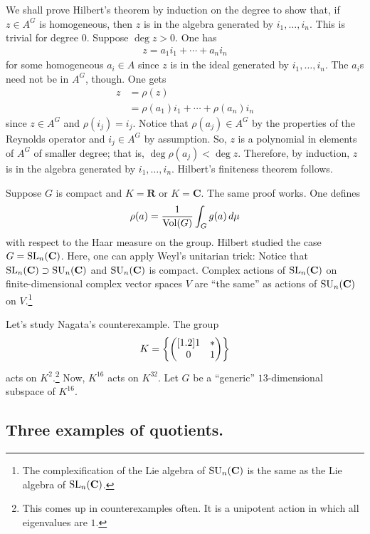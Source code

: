 \documentclass [11 pt, oneside] {article}
\begin{document}
We shall prove Hilbert's theorem by induction on the degree to show that, if $z\in A^G$ is homogeneous, then $z$ is in the algebra generated by $i_1,\hdots,i_n$. This is trivial for degree $0$. Suppose $\deg z > 0$. One has
\begin{align*}
	z=a_1i_1 + \cdots +a_ni_n
\end{align*}
for some homogeneous $a_i\in A$ since $z$ is in the ideal generated by $i_1,\hdots, i_n$. The $a_i$s need not be in $A^G$, though. One gets
\begin{align*}
	z &= \rho(z)\\ 
	  &= \rho(a_1)i_1 + \cdots +\rho(a_n)i_n
\end{align*}
since $z\in A^G$ and $\rho(i_j)=i_j$. Notice that $\rho(a_j) \in A^G$ by the properties of the Reynolds operator and $i_j\in A^G$ by assumption. So, $z$ is a polynomial in elements of $A^G$ of smaller degree; that is, $\deg \rho(a_j)<\deg z$. Therefore, by induction, $z$ is in the algebra generated by $i_1,\hdots, i_n$. Hilbert's finiteness theorem follows.

Suppose $G$ is compact and $K=\mathbf{R}$ or $K=\mathbf{C}$. The same proof works. One defines 
\begin{align*}
	\rho(a) = \frac{1}{\operatorname{Vol} (G)}\int_{G}^{} g(a) \, d\mu
\end{align*}		
with respect to the Haar measure on the group. Hilbert studied the case $G=\operatorname{SL}_{n}(\mathbf{C})$. Here, one can apply Weyl's unitarian trick: Notice that $\operatorname{SL}_{n}(\mathbf{C})\supset \operatorname{SU}_n(\mathbf{C})$ and $\operatorname{SU}_n(\mathbf{C})$ is compact. Complex actions of $\operatorname{SL}_{n}(\mathbf{C})$ on finite-dimensional complex vector spaces $V$ are ``the same'' as actions of $\operatorname{SU}_n(\mathbf{C})$ on $V$.\footnote{The complexification of the Lie algebra of $\operatorname{SU}_n(\mathbf{C})$ is the same as the Lie algebra of $\operatorname{SL}_{n}(\mathbf{C})$.}

Let's study Nagata's counterexample. The group
\begin{align*}
	K = \left\{ \begin{pmatrix} [1.2] 1&*\\0&1\end{pmatrix} \right\} 
\end{align*}
acts on $K^2$.\footnote{This comes up in counterexamples often. It is a unipotent action in which all eigenvalues are $1$.} Now, $K^{16}$ acts on $K^{32}$. Let $G$ be a ``generic'' $13$-dimensional subspace of $K^{16}$. 


\subsection{Three examples of quotients.}
\end{document}
